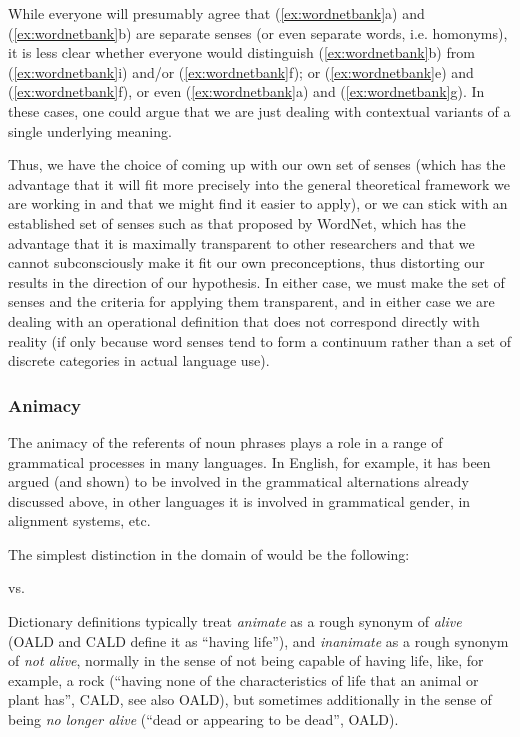 While everyone will presumably agree that (\ref{ex:wordnetbank}a) and (\ref{ex:wordnetbank}b) are separate senses (or even separate words, i.e. homonyms), it is less clear whether everyone would distinguish (\ref{ex:wordnetbank}b) from (\ref{ex:wordnetbank}i) and\slash or (\ref{ex:wordnetbank}f); or (\ref{ex:wordnetbank}e) and (\ref{ex:wordnetbank}f), or even (\ref{ex:wordnetbank}a) and (\ref{ex:wordnetbank}g). In these cases, one could argue that we are just dealing with contextual variants of a single underlying  meaning.

Thus, we have the choice of coming up with our own set of senses (which has the advantage that it will fit more precisely into the general theoretical framework we are working in and that we might find it easier to apply), or we can stick with an established set of senses such as that proposed by WordNet, which has the advantage that it is maximally transparent to other researchers and that we cannot subconsciously make it fit our own preconceptions, thus distorting our results in the direction of our hypothesis.  In either case, we must make the set of senses and the criteria for applying them transparent, and in either case we are dealing with an operational  definition that does not correspond directly with reality (if only because word senses tend to form a continuum rather than a set of discrete categories  in actual language use).

\subsubsection{Animacy}
\label{sec:operationalizinganimacy}

The animacy  of the referents of noun  phrases plays a role in a range of grammatical processes in many languages. In English, for example, it has been argued (and shown) to be involved in the grammatical alternations  already discussed above, in other languages it is involved in grammatical gender, in alignment systems, etc.

The simplest distinction in the domain of   would be the following:

\begin{exe}
\ex {} vs. 
\label{ex:animacyfirst}
\end{exe}

Dictionary  definitions typically treat \textit{animate}  as a rough synonym  of \textit{alive} (OALD and CALD define it as ``having life''), and \textit{inanimate}  as a rough synonym of \textit{not alive}, normally in the sense of not being capable of having life, like, for example, a rock (``having none of the characteristics of life that an animal or plant has'', CALD, see also OALD), but sometimes additionally in the sense of being \textit{no longer alive} (``dead or appearing to be dead'', OALD).

